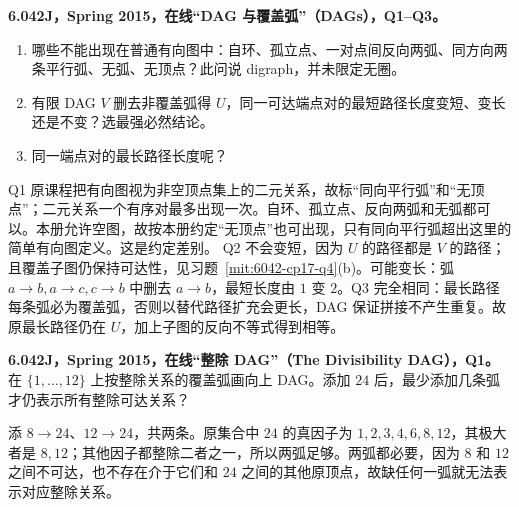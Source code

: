 \begin{exercise}
\textbf{6.042J，Spring 2015，在线“DAG 与覆盖弧”（DAGs），Q1--Q3。}
\begin{enumerate}[label=Q\arabic*.]
\item\label{mit:6042-online-dags-q1} 哪些不能出现在普通有向图中：自环、孤立点、一对点间反向两弧、同方向两条平行弧、无弧、无顶点？此问说 digraph，并未限定无圈。
\item\label{mit:6042-online-dags-q2} 有限 DAG $V$ 删去非覆盖弧得 $U$，同一可达端点对的最短路径长度变短、变长还是不变？选最强必然结论。
\item\label{mit:6042-online-dags-q3} 同一端点对的最长路径长度呢？
\end{enumerate}
\end{exercise}
\begin{solution}
Q1 原课程把有向图视为非空顶点集上的二元关系，故标“同向平行弧”和“无顶点”；二元关系一个有序对最多出现一次。自环、孤立点、反向两弧和无弧都可以。本册允许空图，故按本册约定“无顶点”也可出现，只有同向平行弧超出这里的简单有向图定义。这是约定差别。
Q2 不会变短，因为 $U$ 的路径都是 $V$ 的路径；且覆盖子图仍保持可达性，见习题~\ref{mit:6042-cp17-q4}(b)。可能变长：弧 $a\to b,a\to c,c\to b$ 中删去 $a\to b$，最短长度由 $1$ 变 $2$。Q3 完全相同：最长路径每条弧必为覆盖弧，否则以替代路径扩充会更长，DAG 保证拼接不产生重复。故原最长路径仍在 $U$，加上子图的反向不等式得到相等。
\end{solution}

\begin{exercise}\label{mit:6042-online-the-divisibility-dag-q1}
\textbf{6.042J，Spring 2015，在线“整除 DAG”（The Divisibility DAG），Q1。}
在 $\{1,\ldots,12\}$ 上按整除关系的覆盖弧画向上 DAG。添加 $24$ 后，最少添加几条弧才仍表示所有整除可达关系？
\end{exercise}
\begin{solution}
添 $8\to24$、$12\to24$，共两条。原集合中 $24$ 的真因子为 $1,2,3,4,6,8,12$，其极大者是 $8,12$；其他因子都整除二者之一，所以两弧足够。两弧都必要，因为 $8$ 和 $12$ 之间不可达，也不存在介于它们和 $24$ 之间的其他原顶点，故缺任何一弧就无法表示对应整除关系。
\end{solution}

